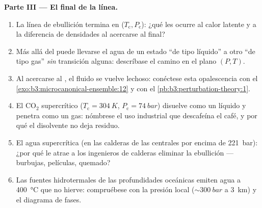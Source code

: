\begin{problem}
\medskip\noindent\textbf{Parte III --- El final de la línea.}
\begin{enumerate}[resume]
  \item La línea de ebullición termina en ($T_{\text{c}},
        P_{\text{c}}$): ¿qué les ocurre al calor latente y a la
        diferencia de densidades al acercarse al final?
  \item Más allá del  puede llevarse el agua de un estado
        ``de tipo líquido'' a otro ``de tipo gas'' \emph{sin} transición
        alguna: descríbase el camino en el plano $(P, T)$.
  \item Al acercarse al , el fluido se vuelve lechoso:
        conéctese esta opalescencia con el
        \cref{exo:b3:microcanonical-ensemble:12} y con el
        \cref{pb:b3:perturbation-theory:1}.
  \item El CO$_2$ supercrítico ($T_{\text{c}} = \qty{304}{K}$,
        $P_{\text{c}} = \qty{74}{bar}$) disuelve como un líquido
        y penetra como un gas: nómbrese el uso industrial que
        descafeína el café, y por qué el disolvente no deja
        residuo.
  \item El agua supercrítica (en las calderas de las centrales por encima de
        \qty{221}{bar}): ¿por qué le atrae a los ingenieros de calderas
        eliminar la ebullición --- burbujas, películas, quemado?
  \item Las fuentes hidrotermales de las profundidades oceánicas emiten agua a
        \qty{400}{\celsius} que no hierve: compruébese con la
        presión local ($\sim\qty{300}{bar}$ a \qty{3}{km}) y
        el diagrama de fases.
\end{enumerate}


\end{problem}
